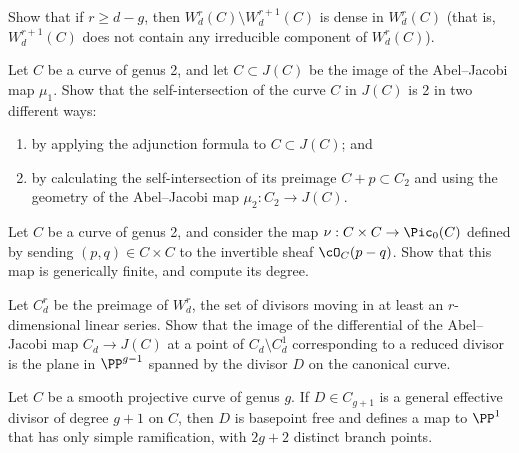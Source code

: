 \begin{exercise}
Show that if $r \geq d-g$, then $W^r_d(C) \setminus W^{r+1}_d(C)$ is
dense in $W^r_d(C)$ (that is, $W^{r+1}_d(C)$ does not contain any
irreducible component of $W^r_d(C)$).
\end{exercise}

\begin{exercise}
Let $C$ be a curve of genus 2, and let $C \subset J(C)$ be the image
of the
Abel--Jacobi map
%
$\mu_1$. Show that the
self-intersection
%
of the curve $C$ in $J(C)$ is 2 in two different ways:
\begin{enumerate}
\item by applying the
adjunction formula
%
 to $C \subset J(C)$; and
\item by calculating the self-intersection of its preimage
$C + p \subset C_2$ and using the geometry of the
Abel--Jacobi map $\mu_2 : C_2 \to J(C)$.
\end{enumerate}
\end{exercise}

\begin{exercise}
Let $C$ be a curve of genus 2, and consider the map $\nu : C \times C
\to \Pic_0(C)$ defined by sending $(p, q)\in C \times C$ to the
invertible sheaf $\cO_C(p-q)$. Show that this map is
generically finite,
%
and compute its degree.
\end{exercise}

\begin{exercise} \label{comparison with geometric RR}
Let $C^{r}_{d}$ be the preimage of $W^{r}_{d}$, the set of divisors moving in at least an $r$-dimensional linear series.
Show that the image of the
differential of the Abel--Jacobi map
%
$C_{d}
\to J(C)$ at a point of $C_{d} \setminus C^1_d$  corresponding to a
reduced divisor
%
 is  the plane in $\PP^{g-1}$ spanned by the divisor
$D$ on the canonical curve.
\end{exercise}

\begin{exercise}[$g+1$ theorem]\label{g+1 theorem}
Let $C$ be a smooth projective curve of genus $g$.
%
If $D \in C_{g+1}$ is a
general effective divisor
%
of degree $g+1$ on $C$, then
$D$ is basepoint free and defines a  map to $\PP^1$ that has only
simple ramification, with $2g+2$ distinct
%
branch points.
\end{exercise}

